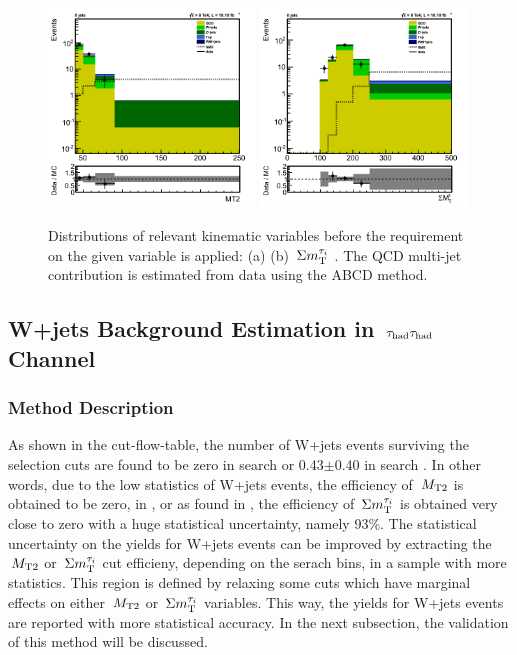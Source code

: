 \begin{figure}[htbp]
\centering
\includegraphics[width=0.49\textwidth]{QCDbginTauTau/Bin1_QCDdatadriven2.png}
\includegraphics[width=0.49\textwidth]{QCDbginTauTau/Bin2_QCDdatadriven2.png} \\
\caption{Distributions of relevant kinematic variables before the requirement on the given variable
is applied: (a) \mttwo  (b) $\,\Sigma m_{\rm T}^{\tau_i}$ . The QCD multi-jet contribution is estimated from data using the ABCD method.}
\label{fig:5QCDbg}
\end{figure}

\subsection{\texorpdfstring{W+jets Background Estimation in $\,\tau_{\rm had}\tau_{\rm had}$ Channel}{W+jets Background Estimation in tau-tau Channel}}
\subsubsection{Method Description}
As shown in the cut-flow-table, the number of W+jets events surviving the selection cuts are found to be zero in search \binone or 0.43$\pm$0.40 in search \bintwo. In other words, due to the low statistics of W+jets events, the efficiency of $\,{M_{\rm T2}}$ is obtained to be zero, in \binone, or as found in \bintwo, the efficiency of $\,\Sigma m_{\rm T}^{\tau_i}$ is obtained very close to zero with a huge statistical uncertainty, namely 93\%. The statistical uncertainty on the yields for W+jets events can be improved by extracting the $\,{M_{\rm T2}}$ or $\,\Sigma m_{\rm T}^{\tau_i}$ cut efficieny, depending on the serach bins, in a sample with more statistics. This region is defined by relaxing some cuts which have marginal effects on either $\,{M_{\rm T2}}$ or $\,\Sigma m_{\rm T}^{\tau_i}$ variables. This way, the yields for W+jets events are reported with more statistical accuracy. In the next subsection, the validation of this method will be discussed.\\

